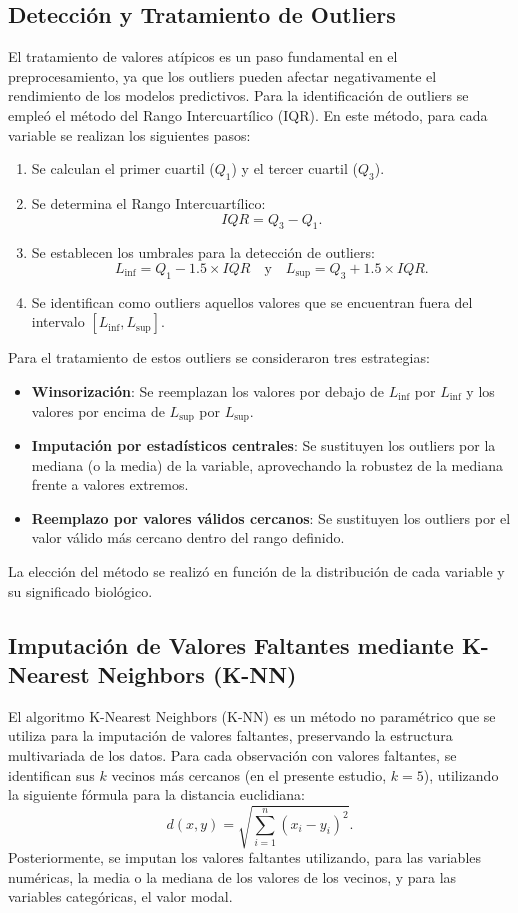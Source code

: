 \subsection{Detección y Tratamiento de Outliers}\label{subsec:outliers}
El tratamiento de valores atípicos es un paso fundamental en el preprocesamiento, ya que los outliers pueden afectar negativamente el rendimiento de los modelos predictivos. Para la identificación de outliers se empleó el método del Rango Intercuartílico (IQR). En este método, para cada variable se realizan los siguientes pasos:

\begin{enumerate}
    \item Se calculan el primer cuartil ($Q_1$) y el tercer cuartil ($Q_3$).
    \item Se determina el Rango Intercuartílico:
    \[
    IQR = Q_3 - Q_1.
    \]
    \item Se establecen los umbrales para la detección de outliers:
    \[
    L_{\text{inf}} = Q_1 - 1.5 \times IQR \quad \text{y} \quad L_{\text{sup}} = Q_3 + 1.5 \times IQR.
    \]
    \item Se identifican como outliers aquellos valores que se encuentran fuera del intervalo $[L_{\text{inf}}, L_{\text{sup}}]$.
\end{enumerate}

Para el tratamiento de estos outliers se consideraron tres estrategias:
\begin{itemize}
    \item \textbf{Winsorización}: Se reemplazan los valores por debajo de $L_{\text{inf}}$ por $L_{\text{inf}}$ y los valores por encima de $L_{\text{sup}}$ por $L_{\text{sup}}$.
    \item \textbf{Imputación por estadísticos centrales}: Se sustituyen los outliers por la mediana (o la media) de la variable, aprovechando la robustez de la mediana frente a valores extremos.
    \item \textbf{Reemplazo por valores válidos cercanos}: Se sustituyen los outliers por el valor válido más cercano dentro del rango definido.
\end{itemize}

La elección del método se realizó en función de la distribución de cada variable y su significado biológico.

\subsection{Imputación de Valores Faltantes mediante K-Nearest Neighbors (K-NN)}
El algoritmo K-Nearest Neighbors (K-NN) es un método no paramétrico que se utiliza para la imputación de valores faltantes, preservando la estructura multivariada de los datos. Para cada observación con valores faltantes, se identifican sus $k$ vecinos más cercanos (en el presente estudio, $k=5$), utilizando la siguiente fórmula para la distancia euclidiana:
\[
d(x, y) = \sqrt{\sum_{i=1}^{n} (x_i - y_i)^2}.
\]
Posteriormente, se imputan los valores faltantes utilizando, para las variables numéricas, la media o la mediana de los valores de los vecinos, y para las variables categóricas, el valor modal.

